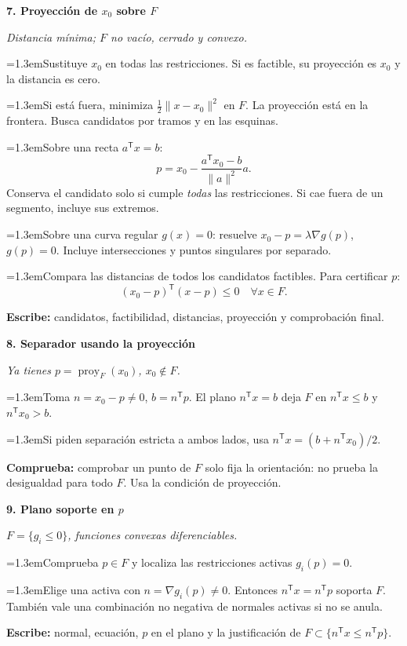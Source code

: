 \documentclass[a4paper,landscape]{article}
\newcommand{\T}{^{\mathsf T}}
\newcommand{\caso}[2]{\par\vspace{5pt}\colorbox{pale}{\parbox{\dimexpr\linewidth-2\fboxsep}{\bfseries\color{accent}#1}}\par\textit{#2}\par}
\newcommand{\paso}[2]{\par\hangindent=1.3em\hangafter=1\makebox[1.3em][l]{\textbf{\color{accent}#1}}#2}
\newcommand{\escribe}[1]{\par\textbf{Escribe:} #1}
\newcommand{\ojo}[1]{\par\textbf{Comprueba:} #1}
\newcommand{\columna}[1]{\begin{minipage}[t]{0.319\textwidth}\fontsize{9.2}{10.6}\selectfont\RaggedRight #1\end{minipage}}
\begin{document}
\columna{
\caso{7. Proyección de \(x_0\) sobre \(F\)}{Distancia mínima; \(F\) no vacío, cerrado y convexo.}
\paso{1.}{Sustituye \(x_0\) en todas las restricciones. Si es factible, su proyección es \(x_0\) y la distancia es cero.}
\paso{2.}{Si está fuera, minimiza \(\tfrac12\|x-x_0\|^2\) en \(F\). La proyección está en la frontera. Busca candidatos por tramos y en las esquinas.}
\paso{3.}{Sobre una recta \(a\T x=b\):
\[p=x_0-\frac{a\T x_0-b}{\|a\|^2}a.\]
Conserva el candidato solo si cumple \emph{todas} las restricciones. Si cae fuera de un segmento, incluye sus extremos.}
\paso{4.}{Sobre una curva regular \(g(x)=0\): resuelve \(x_0-p=\lambda\nabla g(p)\), \(g(p)=0\). Incluye intersecciones y puntos singulares por separado.}
\paso{5.}{Compara las distancias de todos los candidatos factibles. Para certificar \(p\):
\[(x_0-p)\T(x-p)\le0\quad\forall x\in F.\]}
\escribe{candidatos, factibilidad, distancias, proyección y comprobación final.}

\caso{8. Separador usando la proyección}{Ya tienes \(p=\operatorname{proy}_F(x_0)\), \(x_0\notin F\).}
\paso{1.}{Toma \(n=x_0-p\ne0\), \(b=n\T p\). El plano \(n\T x=b\) deja \(F\) en \(n\T x\le b\) y \(n\T x_0>b\).}
\paso{2.}{Si piden separación estricta a ambos lados, usa \(n\T x=(b+n\T x_0)/2\).}
\ojo{comprobar un punto de \(F\) solo fija la orientación: no prueba la desigualdad para todo \(F\). Usa la condición de proyección.}

\caso{9. Plano soporte en \(p\)}{\(F=\{g_i\le0\}\), funciones convexas diferenciables.}
\paso{1.}{Comprueba \(p\in F\) y localiza las restricciones activas \(g_i(p)=0\).}
\paso{2.}{Elige una activa con \(n=\nabla g_i(p)\ne0\). Entonces \(n\T x=n\T p\) soporta \(F\). También vale una combinación no negativa de normales activas si no se anula.}
\escribe{normal, ecuación, \(p\) en el plano y la justificación de \(F\subset\{n\T x\le n\T p\}\).}
}
\end{document}
